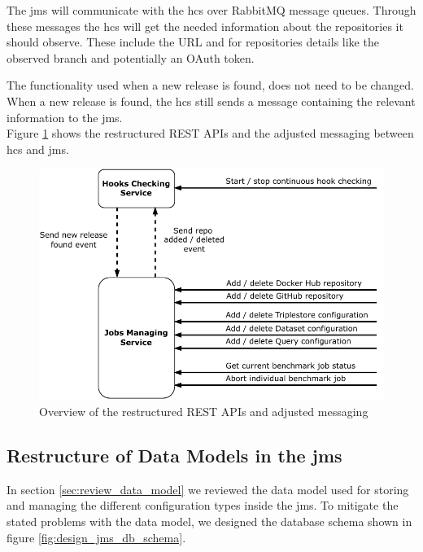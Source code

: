 The \ac{jms} will communicate with the \ac{hcs} over RabbitMQ message queues.
Through these messages the \ac{hcs} will get the needed information about the repositories it should observe.
These include the URL and for \gh{} repositories details like the observed branch and potentially an OAuth token.

The functionality used when a new release is found, does not need to be changed.
When a new release is found, the \ac{hcs} still sends a message containing the relevant information to the \ac{jms}.
\\

Figure \ref{fig:repo_management_restructure} shows the restructured REST APIs and the adjusted messaging between \ac{hcs} and \ac{jms}.

\begin{figure}[tbph]
	\centering
	\includegraphics[width=.65\textwidth]{figures/messaging-implementation-hcs-jms.pdf}
	\caption{Overview of the restructured REST APIs and adjusted messaging}
	\label{fig:repo_management_restructure}
\end{figure}



\subsection{Restructure of Data Models in the \acl{jms}}
\label{sec:data_model_restructure_jms}
In section \ref{sec:review_data_model} we reviewed the data model used for storing and managing the different configuration types inside the \ac{jms}.
To mitigate the stated problems with the data model, we designed the database schema shown in figure \ref{fig:design_jms_db_schema}.

